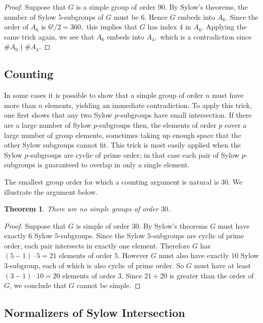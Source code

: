 \documentclass[11pt, oneside]{article}   	%
\newtheorem{theorem}{Theorem}
\begin{document}
\begin{proof}
Suppose that $G$ is a simple group of order $90$.  By Sylow's theorems, the number of Sylow $5$-subgroups of $G$ must be $6$.  Hence $G$ embeds into $A_6$.  Since the order of $A_6$ is $6!/2 = 360,$ this implies that $G$ has index $4$ in $A_6.$  Applying the same trick again, we see that $A_6$ embeds into $A_4,$ which is a contradiction since $\# A_6 \nmid \# A_4.$
\end{proof}

\subsection{Counting}

In some cases it is possible to show that a simple group of order $n$ must have more than $n$ elements, yielding an immediate contradiction.  To apply this trick, one first shows that any two Sylow $p$-subgroups have small intersection.  If there are a large number of Sylow $p$-subgroups then, the elements of order $p$ cover a large number of group elements, sometimes taking up enough space that the other Sylow subgroups cannot fit.  This trick is most easily applied when the Sylow $p$-subgroups are cyclic of prime order; in that case each pair of Sylow $p$-subgroups is guaranteed to overlap in only a single element.

The smallest group order for which a counting argument is natural is $30.$  We illustrate the argument below.
\begin{theorem}
There are no simple groups of order $30$.
\end{theorem}

\begin{proof}
Suppose that $G$ is simple of order $30$.  By Sylow's theorems $G$ must have exactly $6$ Sylow $5$-subgroups.  Since the Sylow $5$-subgroups are cyclic of prime order, each pair intersects in exactly one element.  Therefore $G$ has $(5-1) \cdot 5 = 21$ elements of order $5$.  However $G$ must also have exactly $10$ Sylow $3$-subgroup, each of which is also cyclic of prime order.  So $G$ must have at least $(3-1)\cdot 10 = 20$ elements of order $3$.  Since $21 + 20$ is greater than the order of $G$, we conclude that $G$ cannot be simple.  
\end{proof}


\subsection{Normalizers of Sylow Intersection}
\end{document}
